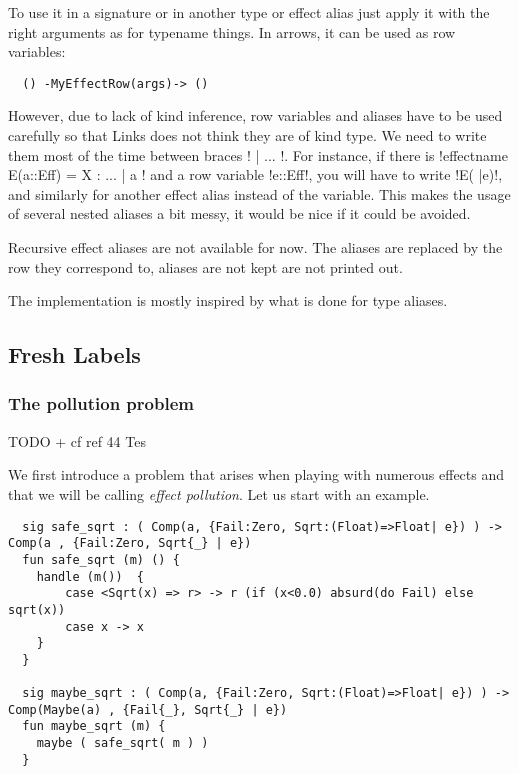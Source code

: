 \documentclass[11pt, nonacm=true, language=french, language=english]{acmart}
\begin{document}
To use it in a signature or in another type or effect alias just apply it with the right arguments as for typename things. In arrows, it can be used as row variables:
\begin{lstlisting}
  () -MyEffectRow(args)-> ()
\end{lstlisting}

However, due to lack of kind inference, row variables and aliases have to be used carefully so that Links does not think they are of kind type. We need to write them most of the time between braces !{ | ... }!. For instance, if there is !effectname E(a::Eff) = {X : ... | a }! and a row variable !e::Eff!, you will have to write !E({ |e})!, and similarly for another effect alias instead of the variable. This makes the usage of several nested aliases a bit messy, it would be nice if it could be avoided.

Recursive effect aliases are not available for now. The aliases are replaced by the row they correspond to, aliases are not kept are not printed out.

The implementation is mostly inspired by what is done for type aliases.

\subsection{Fresh Labels}
\label{sec:fresh-labels}

\subsubsection{The pollution problem}
\label{sec:pollution-problem}

TODO + cf ref 44 Tes

We first introduce a problem that arises when playing with numerous effects and that we will be calling \emph{effect pollution}. Let us start with an example.

\begin{lstlisting}
  sig safe_sqrt : ( Comp(a, {Fail:Zero, Sqrt:(Float)=>Float| e}) ) -> Comp(a , {Fail:Zero, Sqrt{_} | e})
  fun safe_sqrt (m) () {
    handle (m())  {
        case <Sqrt(x) => r> -> r (if (x<0.0) absurd(do Fail) else sqrt(x))
        case x -> x
    }
  }

  sig maybe_sqrt : ( Comp(a, {Fail:Zero, Sqrt:(Float)=>Float| e}) ) -> Comp(Maybe(a) , {Fail{_}, Sqrt{_} | e})
  fun maybe_sqrt (m) {
    maybe ( safe_sqrt( m ) )
  }
\end{lstlisting}
\end{document}
